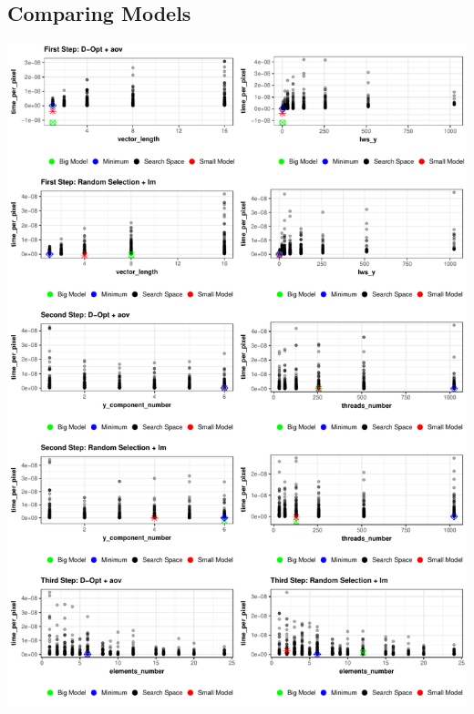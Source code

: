 \documentclass[final,12pt,a4paper]{article}
\begin{document}
\subsection{Comparing Models}
\label{sec:orgb6fa1bf}
\begin{center}
\includegraphics[width=.9\linewidth]{../img/model_comparison.pdf}
\end{center}
\end{document}
